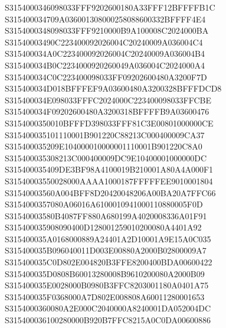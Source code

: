 \documentclass[12pt,a4paper]{article}
\begin{document}
\begin{framed}
{S3154000346098033FFF9202600180A33FFF12BFFFFB1C\newline
S315400034709A036001308000258088600332BFFFF4E4\newline
S3154000348098033FFF9210000B9A100008C2024000BA\newline
S31540003490C223400092026004C20240009A036004C4\newline
S315400034A0C223400092026004C20240009A036004B4\newline
S315400034B0C2234000920260049A036004C2024000A4\newline
S315400034C0C223400098033FF09202600480A3200F7D\newline
S315400034D018BFFFEF9A03600480A3200328BFFFDCD8\newline
S315400034E098033FFFC2024000C223400098033FFCBE\newline
S315400034F09202600480A3200318BFFFFB9A03600476\newline
S3154000350010BFFFD398033FFF81C3E00801000000CE\newline
S315400035101110001B901220C88213C000400009CA37\newline
S315400035209E104000010000001110001B901220C8A0\newline
S315400035308213C000400009DC9E10400001000000DC\newline
S315400035409DE3BF98A4100019B210001A80A4A000F1\newline
S31540003550028000AAAA1000187FFFFFEE9010001804\newline
S31540003560A004BFF8D20420048206A00BA20A7FFC66\newline
S3154000357080A06016A6100010941000110880005F0D\newline
S31540003580B4087FF880A680199A4020008336A01F91\newline
S315400035908090400D128001259010200080A4401A92\newline
S315400035A0168000889A24401A2D10001A9E15A0C035\newline
S315400035B096040011D003E00880A2000B02800009A7\newline
S315400035C0D802E004820B3FFE8200400BDA00600422\newline
S315400035D0808B60013280008B9610200080A2000B09\newline
S315400035E0028000B0980B3FFC8203001180A0401A75\newline
S315400035F0368000A7D802E008808A60011280001653\newline
S3154000360080A2E000C2040000A8240001DA052004DC\newline
S315400036100280000B920B7FFC8215A0C0DA00600886\newline
}
\end{framed}
\end{document}
